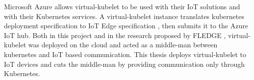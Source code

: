 Microsoft Azure allows virtual-kubelet to be used with their IoT solutions and with their Kubernetes services\cite{azure-vk}. A virtual-kubelet instance translates kubernetes deployment specification to IoT Edge specification , then submits it to the Azure IoT hub. Both in this project and in the research proposed by FLEDGE \cite{fledge}, virtual-kubelet was deployed on the cloud and acted as a middle-man between kubernetes and IoT based communication. This thesis deploys virtual-kubelet to IoT devices and cuts the middle-man by providing communication only through Kubernetes.
